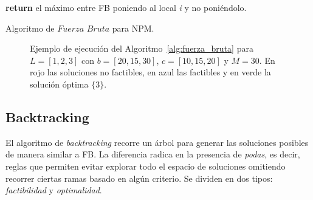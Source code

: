\begin{algorithm}
    \begin{algorithmic}[1]
                
                    \EndIf
                    
                    \EndIf
                    
                    \EndIf
                    
                \EndFor
            \Else 
                \State \textbf{return} el máximo entre FB poniendo al local \textit{i} y no poniéndolo.
            \EndIf
        \EndFunction
    \end{algorithmic}
    \caption{Algoritmo de $Fuerza$ $Bruta$ para NPM.}
    \label{alg:fuerza_bruta}
\end{algorithm}



\begin{figure}[htbp]
    \centering
    
    \caption{Ejemplo de ejecución del Algoritmo~\ref{alg:fuerza_bruta} para $L=[1,2,3]$ con $b=[20,15,30]$, $c=[10, 15, 20]$ y $M=30$. En rojo las soluciones no factibles, en azul las factibles y en verde la solución óptima $\{3\}$.}
    \label{fig:ejemplo_fuerza_bruta}
\end{figure}

\subsection{Backtracking}

El algoritmo de \textit{backtracking} recorre un árbol para generar las soluciones posibles de manera similar a FB. La diferencia radica en la presencia de \textit{podas}, es decir, reglas que permiten evitar explorar todo el espacio de soluciones omitiendo recorrer ciertas ramas basado en algún criterio. Se dividen en dos tipos: \textit{factibilidad} y \textit{optimalidad}.

